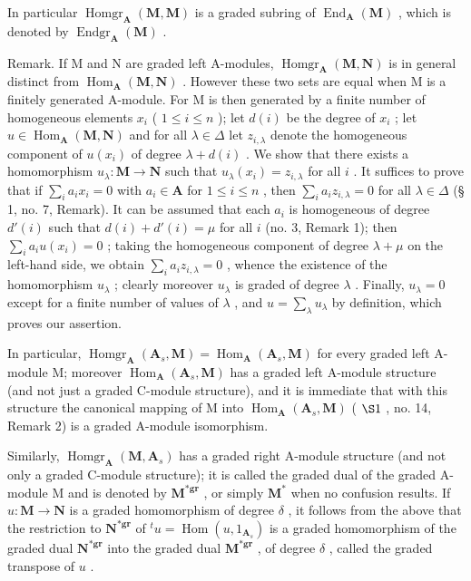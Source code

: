 In particular \(\operatorname{Homgr}_{\mathbf{A}}(\mathbf{M}, \mathbf{M})\) is a graded subring of \(\operatorname{End}_{\mathbf{A}}(\mathbf{M})\) , which is denoted by \(\operatorname{Endgr}_{\mathbf{A}}(\mathbf{M})\) .

Remark. If M and N are graded left A-modules, \(\operatorname{Homgr}_{\mathbf{A}}(\mathbf{M}, \mathbf{N})\) is in general distinct from \(\operatorname{Hom}_{\mathbf{A}}(\mathbf{M}, \mathbf{N})\) . However these two sets are equal when M is a finitely generated A-module. For M is then generated by a finite number of homogeneous elements \(x_{i}\) ( \(1 \leqslant i \leqslant n\) ); let \(d(i)\) be the degree of \(x_{i}\) ; let \(u \in \operatorname{Hom}_{\mathbf{A}}(\mathbf{M}, \mathbf{N})\) and for all \(\lambda \in \Delta\) let \(z_{i,\lambda}\) denote the homogeneous component of \(u(x_{i})\) of degree \(\lambda + d(i)\) . We show that there exists a homomorphism \(u_{\lambda}: \mathbf{M} \to \mathbf{N}\) such that \(u_{\lambda}(x_{i}) = z_{i,\lambda}\) for all \(i\) . It suffices to prove that if \(\sum_{i} a_{i} x_{i} = 0\) with \(a_{i} \in \mathbf{A}\) for \(1 \leqslant i \leqslant n\) , then \(\sum_{i} a_{i} z_{i,\lambda} = 0\) for all \(\lambda \in \Delta\) (§ 1, no. 7, Remark). It can be assumed that each \(a_{i}\) is homogeneous of degree \(d'(i)\) such that \(d(i) + d'(i) = \mu\) for all \(i\) (no. 3, Remark 1); then \(\sum_{i} a_{i} u(x_{i}) = 0\) ; taking the homogeneous component of degree \(\lambda + \mu\) on the left-hand side, we obtain \(\sum_{i} a_{i} z_{i,\lambda} = 0\) , whence the existence of the homomorphism \(u_{\lambda}\) ; clearly moreover \(u_{\lambda}\) is graded of degree \(\lambda\) . Finally, \(u_{\lambda} = 0\) except for a finite number of values of \(\lambda\) , and \(u = \sum_{\lambda} u_{\lambda}\) by definition, which proves our assertion.

In particular, \(\operatorname{Homgr}_{\mathbf{A}}(\mathbf{A}_s, \mathbf{M}) = \operatorname{Hom}_{\mathbf{A}}(\mathbf{A}_s, \mathbf{M})\) for every graded left A-module M; moreover \(\operatorname{Hom}_{\mathbf{A}}(\mathbf{A}_s, \mathbf{M})\) has a graded left A-module structure (and not just a graded C-module structure), and it is immediate that with this structure the canonical mapping of M into \(\operatorname{Hom}_{\mathbf{A}}(\mathbf{A}_s, \mathbf{M})\) ( \(\S 1\) , no. 14, Remark 2) is a graded A-module isomorphism.

Similarly, \(\operatorname{Homgr}_{\mathbf{A}}(\mathbf{M}, \mathbf{A}_s)\) has a graded right A-module structure (and not only a graded C-module structure); it is called the graded dual of the graded A-module M and is denoted by \(\mathbf{M}^{*\mathbf{gr}}\) , or simply \(\mathbf{M}^*\) when no confusion results. If \(u: \mathbf{M} \to \mathbf{N}\) is a graded homomorphism of degree \(\delta\) , it follows from the above that the restriction to \(\mathbf{N}^{*\mathbf{gr}}\) of \(^t u = \operatorname{Hom}(u, 1_{\mathbf{A}_s})\) is a graded homomorphism of the graded dual \(\mathbf{N}^{*\mathbf{gr}}\) into the graded dual \(\mathbf{M}^{*\mathbf{gr}}\) , of degree \(\delta\) , called the graded transpose of \(u\) .

